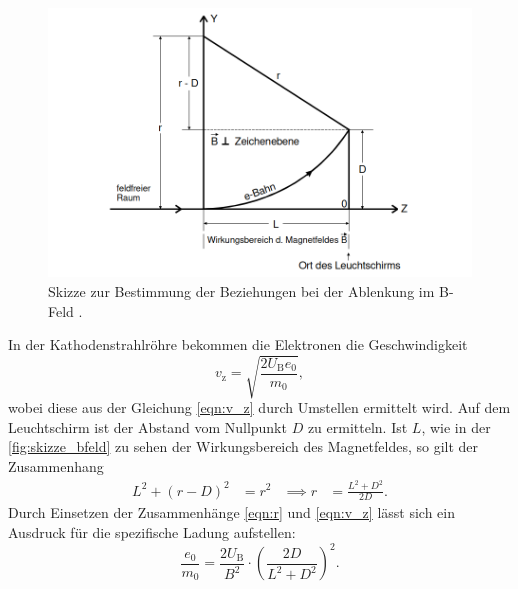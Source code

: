     \begin{figure} 
        \centering
        \includegraphics[width=\textwidth]{bilder/zeichnung_magnetfeld.png}
        \caption{Skizze zur Bestimmung der Beziehungen bei der Ablenkung im B-Feld \cite{anleitung502}.}
        \label{fig:skizze_bfeld}
    \end{figure}

    \noindent In der Kathodenstrahlröhre bekommen die Elektronen die Geschwindigkeit 
    \begin{equation*}
        v_{\text{z}} = \sqrt{\frac{2 U_{\text{B}}e_0}{m_0}},
    \end{equation*}
    wobei diese aus der Gleichung \eqref{eqn:v_z} durch Umstellen ermittelt wird. Auf dem Leuchtschirm ist der Abstand vom Nullpunkt $D$ zu ermitteln.
    Ist $L$, wie in der \autoref{fig:skizze_bfeld} zu sehen der Wirkungsbereich des Magnetfeldes, so gilt der Zusammenhang
    \begin{align*}
        L^2 + (r - D)^2 &= r^2  &\implies r &= \frac{L^2 + D^2}{2D}.
    \end{align*}
    Durch Einsetzen der Zusammenhänge \eqref{eqn:r} und \eqref{eqn:v_z} lässt sich ein Ausdruck für die spezifische Ladung aufstellen:
    \begin{equation}\label{eq:e0_m0}
        \frac{e_0}{m_0} = \frac{2 U_{\text{B}}}{B^2} \cdot \left(\frac{2D}{L^2 + D^2}\right)^2 .
    \end{equation}